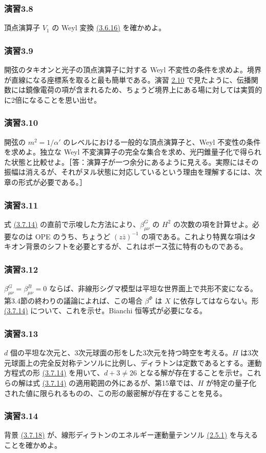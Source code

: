 \medskip
\subsubsection*{演習3.8}\label{ex:3.8}
頂点演算子 $V_1$ の Weyl 変換 \hyperref[eq:3.6.16]{(3.6.16)} を確かめよ。

\medskip
\subsubsection*{演習3.9}\label{ex:3.9}
開弦のタキオンと光子の頂点演算子に対する Weyl 不変性の条件を求めよ。境界が直線になる座標系を取ると最も簡単である。演習 \hyperref[ex:2.10]{2.10} で見たように、伝播関数には鏡像電荷の項が含まれるため、ちょうど境界上にある場に対しては実質的に2倍になることを思い出せ。

\medskip
\subsubsection*{演習3.10}\label{ex:3.10}
開弦の $m^2=1/\alpha'$ のレベルにおける一般的な頂点演算子と、Weyl 不変性の条件を求めよ。独立な Weyl 不変演算子の完全な集合を求め、光円錐量子化で得られた状態と比較せよ。［答：演算子が一つ余分にあるように見える。実際にはその振幅は消えるが、それがヌル状態に対応しているという理由を理解するには、次章の形式が必要である。］

\medskip
\subsubsection*{演習3.11}\label{ex:3.11}
式 \hyperref[eq:3.7.14a]{(3.7.14)} の直前で示唆した方法により、$\beta^G_{\mu\nu}$ の $H^2$ の次数の項を計算せよ。必要なのは OPE のうち、ちょうど $(z\bar z)^{-1}$ の項である。これより特異な項はタキオン背景のシフトを必要とするが、これはボース弦に特有のものである。

\medskip
\subsubsection*{演習3.12}\label{ex:3.12}
$\beta^G_{\mu\nu}=\beta^B_{\mu\nu}=0$ ならば、非線形シグマ模型は平坦な世界面上で共形不変になる。第3.4節の終わりの議論によれば、この場合 $\beta^\Phi$ は $X$ に依存してはならない。形 \hyperref[eq:3.7.14a]{(3.7.14)} について、これを示せ。Bianchi 恒等式が必要になる。

\medskip
\subsubsection*{演習3.13}\label{ex:3.13}
$d$ 個の平坦な次元と、3次元球面の形をした3次元を持つ時空を考える。$H$ は3次元球面上の完全反対称テンソルに比例し、ディラトンは定数であるとする。運動方程式の形 \hyperref[eq:3.7.14a]{(3.7.14)} を用いて、$d+3\ne26$ となる解が存在することを示せ。これらの解は式 \hyperref[eq:3.7.14a]{(3.7.14)} の適用範囲の外にあるが、第15章では、$H$ が特定の量子化された値に限られるものの、この形の厳密解が存在することを見る。

\medskip
\subsubsection*{演習3.14}\label{ex:3.14}
背景 \hyperref[eq:3.7.18]{(3.7.18)} が、線形ディラトンのエネルギー運動量テンソル \hyperref[eq:2.5.1a]{(2.5.1)} を与えることを確かめよ。

